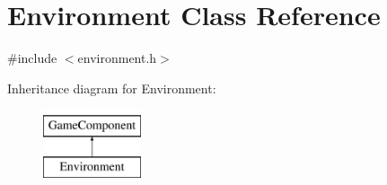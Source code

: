 \hypertarget{class_environment}{}\section{Environment Class Reference}
\label{class_environment}


{\ttfamily \#include $<$environment.\+h$>$}

Inheritance diagram for Environment\+:\begin{figure}[H]
\begin{center}
\leavevmode
\includegraphics[height=2.000000cm]{class_environment}
\end{center}
\end{figure}
